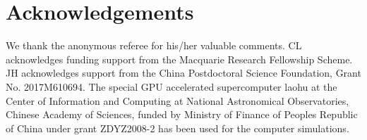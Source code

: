 \documentclass[useAMS,usenatbib,twocolumn]{mnras}
\begin{document}
\section*{Acknowledgements}
We thank the anonymous referee for his/her valuable comments. CL acknowledges funding support from the Macquarie Research Fellowship Scheme. JH acknowledges support from the China Postdoctoral Science Foundation, Grant No. 2017M610694. The special GPU accelerated supercomputer laohu at the Center of Information and Computing at National Astronomical Observatories, Chinese Academy of Sciences, funded by Ministry of Finance of Peoples Republic of China under grant ZDYZ2008-2 has been used for the computer simulations.

\def\aj{AJ} \def\actaa{Acta Astron.}  \def\araa{ARA\&A} \def\apj{ApJ}
\def\apjl{ApJ} \def\apjs{ApJS} \def\ao{Appl.~Opt.}  \def\apss{Ap\&SS}
\def\aap{A\&A} \def\aapr{A\&A~Rev.}  \def\aaps{A\&AS} \def\azh{AZh}
\def\baas{BAAS} \def\bac{Bull. astr. Inst. Czechosl.}
\def\caa{Chinese Astron. Astrophys.}  \def\cjaa{Chinese
  J. Astron. Astrophys.}  \def\icarus{Icarus} \def\jcap{J. Cosmology
  Astropart. Phys.}  \def\jrasc{JRASC} \def\mnras{MNRAS}
\def\memras{MmRAS} \def\na{New A} \def\nar{New A Rev.}
\def\pasa{PASA} \def\pra{Phys.~Rev.~A} \def\prb{Phys.~Rev.~B}
\def\prc{Phys.~Rev.~C} \def\prd{Phys.~Rev.~D} \def\pre{Phys.~Rev.~E}
\def\prl{Phys.~Rev.~Lett.}  \def\pasp{PASP} \def\pasj{PASJ}
\def\qjras{QJRAS} \def\rmxaa{Rev. Mexicana Astron. Astrofis.}
\def\skytel{S\&T} \def\solphys{Sol.~Phys.}  \def\sovast{Soviet~Ast.}
\def\ssr{Space~Sci.~Rev.}  \def\zap{ZAp} \def\nat{Nature}
\def\natas{Nature Astronomy}
\def\iaucirc{IAU~Circ.}  \def\aplett{Astrophys.~Lett.}
\def\apspr{Astrophys.~Space~Phys.~Res.}
\def\bain{Bull.~Astron.~Inst.~Netherlands}
\def\fcp{Fund.~Cosmic~Phys.}  \def\gca{Geochim.~Cosmochim.~Acta}
\def\grl{Geophys.~Res.~Lett.}  \def\jcp{J.~Chem.~Phys.}
\def\jgr{J.~Geophys.~Res.}
\def\jqsrt{J.~Quant.~Spec.~Radiat.~Transf.}
\def\memsai{Mem.~Soc.~Astron.~Italiana} \def\nphysa{Nucl.~Phys.~A}
\def\physrep{Phys.~Rep.}  \def\physscr{Phys.~Scr}
\def\planss{Planet.~Space~Sci.}  \def\procspie{Proc.~SPIE}
\let\astap=\aap \let\apjlett=\apjl \let\apjsupp=\apjs \let\applopt=\ao
\end{document}
